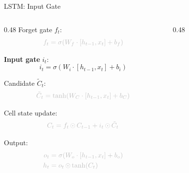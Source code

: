 \begin{frame}{LSTM: Input Gate}
  \begin{columns}[T]
    \begin{column}{0.48\textwidth}
      \textcolor{gray!50}{Forget gate $f_t$:}
      \[
        \textcolor{gray!50}{f_t = \sigma\!\left(W_f \cdot [h_{t-1}, x_t] + b_f\right)}
      \]

      \textbf{Input gate} $i_t$:
      \[
        i_t = \sigma\!\left(W_i \cdot [h_{t-1}, x_t] + b_i\right)
      \]

      \textcolor{gray!50}{Candidate $\tilde{C}_t$:}
      \[
        \textcolor{gray!50}{\tilde{C}_t = \tanh\!\left(W_C \cdot [h_{t-1}, x_t] + b_C\right)}
      \]

      \textcolor{gray!50}{Cell state update:}
      \[
        \textcolor{gray!50}{C_t = f_t \odot C_{t-1} + i_t \odot \tilde{C}_t}
      \]

      \textcolor{gray!50}{Output:}
      \[
      \textcolor{gray!50}{
      \begin{aligned}
        o_t &= \sigma\!\left(W_o \cdot [h_{t-1}, x_t] + b_o\right) \\
        h_t &= o_t \odot \tanh(C_t)
      \end{aligned}
      }
      \]
    \end{column}
    \begin{column}{0.48\textwidth}
      \begin{center}
      \end{center}
    \end{column}
  \end{columns}
\end{frame}


